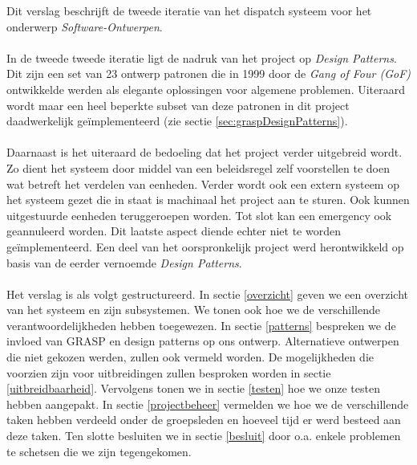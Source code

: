 Dit verslag beschrijft de tweede iteratie van het dispatch systeem voor het onderwerp \textit{Software-Ontwerpen}.
\paragraph{}
In de tweede tweede iteratie ligt de nadruk van het project op \textit{Design Patterns}. Dit zijn een set van 23 ontwerp patronen die in 1999 door de \textit{Gang of Four (GoF)} ontwikkelde werden als elegante oplossingen voor algemene problemen. Uiteraard wordt maar een heel beperkte subset van deze patronen in dit project daadwerkelijk ge\"implementeerd (zie sectie \ref{sec:graspDesignPatterns}).
\paragraph{}
Daarnaast is het uiteraard de bedoeling dat het project verder uitgebreid wordt. Zo dient het systeem door middel van een beleidsregel zelf voorstellen te doen wat betreft het verdelen van eenheden. Verder wordt ook een extern systeem op het systeem gezet die in staat is machinaal het project aan te sturen. Ook kunnen uitgestuurde eenheden teruggeroepen worden. Tot slot kan een emergency ook geannuleerd worden. Dit laatste aspect diende echter niet te worden ge\"implementeerd.
Een deel van het oorspronkelijk project werd herontwikkeld op basis van de eerder vernoemde \textit{Design Patterns}.
\paragraph{}
Het verslag is als volgt gestructureerd. In sectie \ref{overzicht} geven we een overzicht van het systeem en zijn subsystemen.
We tonen ook hoe we de verschillende verantwoordelijkheden hebben toegewezen.
In sectie \ref{patterns} bespreken we de invloed van GRASP en design patterns op ons ontwerp.
Alternatieve ontwerpen die niet gekozen werden, zullen ook vermeld worden.
De mogelijkheden die voorzien zijn voor uitbreidingen zullen besproken worden in sectie \ref{uitbreidbaarheid}.
Vervolgens tonen we in sectie \ref{testen} hoe we onze testen hebben aangepakt.
In sectie \ref{projectbeheer} vermelden we hoe we de verschillende taken hebben verdeeld onder de groepsleden
en hoeveel tijd er werd besteed aan deze taken.
Ten slotte besluiten we in sectie \ref{besluit} door o.a. enkele problemen te schetsen die we zijn tegengekomen.
